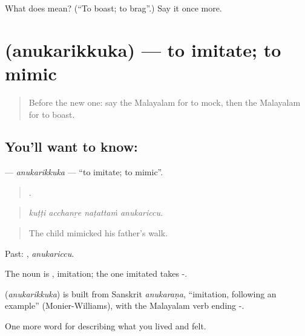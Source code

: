 \begin{tcolorbox}[breakable,colback=teal!4,colframe=teal!35!black,title={Before you move on}]
What does  mean? (\textquotedblleft{}To boast; to brag\textquotedblright{}.) Say it once more.
\end{tcolorbox}
\section[\texorpdfstring{\ml{അനുകരിക്കുക} (anukarikkuka)}{അനുകരിക്കുക (anukarikkuka)}]{ (anukarikkuka) — to imitate; to mimic}

\label{lesson:ML-C531-anukarikkuka}



\begin{quote}
Before the new one: say the Malayalam for to mock, then the Malayalam for to boast.
\end{quote}

\subsection*{You'll want to know: }
\textbf{} — \emph{anukarikkuka} — \textquotedblleft{}to imitate; to mimic\textquotedblright{}.

\begin{quote}
   .
\end{quote}

\begin{quote}
\emph{kuṭṭi acchanṟe naṭattaṁ anukariccu.}
\end{quote}

\begin{quote}
The child mimicked his father's walk.
\end{quote}

Past: , \emph{anukariccu}.

The noun is , imitation; the one imitated takes -.

\begin{cousinweb}
\textbf{} (\emph{anukarikkuka}) is built from Sanskrit \emph{anukaraṇa}, \textquotedblleft{}imitation, following an example\textquotedblright{} (Monier-Williams), with the Malayalam verb ending -.
\end{cousinweb}

\begin{grammarlens}[title={What you've built}]
One more word for describing what you lived and felt.
\end{grammarlens}

